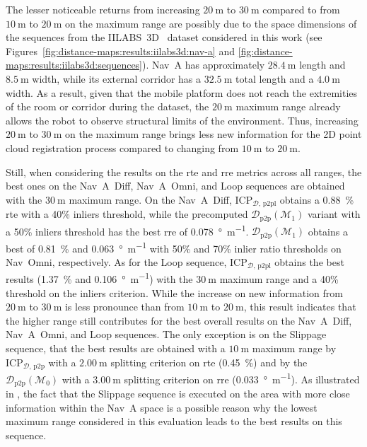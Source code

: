 The lesser noticeable returns from increasing $\SI{20}{\metre}$ to $\SI{30}{\metre}$
compared to from $\SI{10}{\metre}$ to $\SI{20}{\metre}$ on the maximum range are
possibly due to the space dimensions of the sequences from the
IILABS~3D~\cite{ribeiro:access:2025} dataset considered in this work
(see Figures~\ref{fig:distance-maps:results:iilabs3d:nav-a} and
\ref{fig:distance-maps:results:iilabs3d:sequences}).
Nav~A has approximately $\SI{28.4}{\metre}$ length and $\SI{8.5}{\metre}$ width,
while its external corridor has a $\SI{32.5}{\metre}$ total length and a
$\SI{4.0}{\metre}$ width. As a result, given that the mobile platform does not
reach the extremities of the room or corridor during the dataset,
the $\SI{20}{\metre}$ maximum range already allows the robot to observe
structural limits of the environment. Thus, increasing
$\SI{20}{\metre}$ to $\SI{30}{\metre}$ on the maximum range brings less new
information for the 2D point cloud registration process compared to
changing from $\SI{10}{\metre}$ to $\SI{20}{\metre}$.

Still, when considering the results on the \gls{rte} and \gls{rre} metrics
across all ranges, the best ones on the Nav~A~Diff, Nav~A~Omni, and Loop
sequences are obtained with the $\SI{30}{\metre}$ maximum range.
On the Nav~A~Diff, $\mathrm{ICP}_{\mathcal{D},\,\mathrm{p2pl}}$ obtains a
\SI{0.88}{\percent} \gls{rte} with a 40\% inliers threshold, while
the precomputed $\mathcal{D}_\mathrm{p2p}(\mathcal{M}_1)$ variant with a 50\%
inliers threshold has the best \gls{rre} of \SI{0.078}{\degree\per\metre}.
$\mathcal{D}_\mathrm{p2p}(\mathcal{M}_1)$ obtains a best of
\SI{0.81}{\percent} and \SI{0.063}{\degree\per\metre} with 50\% and 70\%
inlier ratio thresholds on Nav~Omni, respectively. As for the Loop sequence,
$\mathrm{ICP}_{\mathcal{D},\,\mathrm{p2pl}}$ obtains the best results
(\SI{1.37}{\percent} and \SI{0.106}{\degree\per\metre}) with the
$\SI{30}{\metre}$ maximum range and a 40\% threshold on the inliers criterion.
While the increase on new information from $\SI{20}{\metre}$ to
$\SI{30}{\metre}$ is less pronounce than from $\SI{10}{\metre}$ to
$\SI{20}{\metre}$, this result indicates that the higher range still contributes
for the best overall results on the Nav~A~Diff, Nav~A~Omni, and Loop sequences.
The only exception is on the Slippage sequence, that the best results are
obtained with a $\SI{10}{\metre}$ maximum range by
$\mathrm{ICP}_{\mathcal{D},\,\mathrm{p2p}}$ with a
$\SI{2.00}{\metre}$ splitting criterion on \gls{rte} (\SI{0.45}{\percent})
and by the $\mathcal{D}_\mathrm{p2p}(\mathcal{M}_0)$ with a
$\SI{3.00}{\metre}$ splitting criterion on \gls{rre}
(\SI{0.033}{\degree\per\metre}).
As illustrated in ,
the fact that the Slippage sequence is executed on the area with more close
information within the Nav~A space is a possible reason why the lowest
maximum range considered in this evaluation leads to the best results
on this sequence.


